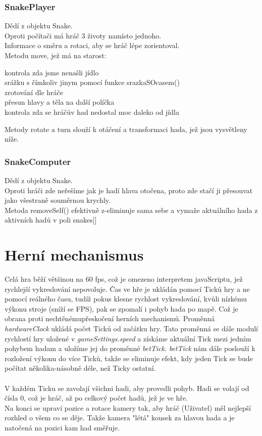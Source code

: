 \documentclass[a4paper,titlepage]{article}
\begin{document}
	\subsubsection{SnakePlayer}
		Dědí z objektu Snake.\\
		Oproti počítači má hráč 3 životy namísto jednoho.\\
		Informace o směru a rotaci, aby se hráč lépe zorientoval.\\
		Metodu move, jež má na starost:\\
		\begin{tabbing}
			kontrola zda jsme nenašli jídlo\\
			srážku s čímkoliv jinym pomocí funkce srazkaSOcasem()\\
			zrotování dle hráče\\
			přesun hlavy a těla na další políčka\\
			kontrola zda se hráčův had nedostal moc daleko od jídla 
		\end{tabbing}	
		Metody rotate a turn slouží k otáčení a transformaci hada, jež jsou vysvětleny níže.		
	\subsubsection{SnakeComputer}		
		Dědí z objektu Snake.\\
		Oproti hráči zde neřešíme jak je hadí hlava otočena, proto zde stačí ji přesouvat jako všestraně souměrnou krychly.\\
		Metoda removeSelf() efektivně z-eliminuje sama sebe a vymaže aktuálního hada z aktivních hadů v poli snakes[]
	\section{Herní mechanismus}
		Celá hra běží většinou na 60 fps, což je omezeno interpretem javaScriptu,
		jež rychlejší vykreslování nepovoluje.
		Čas ve hře je ukládán pomocí Ticků hry a ne pomocí reálného času,
		tudíž pokus klesne rychlost vykreslování,
		kvůli nízkému výkonu stroje (sníží se FPS), pak se zpomalí i pohyb hada po mapě.
		Což je obrana proti nechtěnémupřeskočení herních mechanismů.
		Proměnná \textit{hardwareClock} ukládá počet Ticků od začátku hry.
		Tato proměnná se dále modulí rychlostí hry uložené v \textit{gameSettings.speed}
		a získáme aktuální Tick mezi jedním pohybem hadam a uložíme jej do proměnné \textit{betTick}.
		\textit{betTick} nám dále poslouží k rozložení výkonu do více Ticků, takže se eliminuje efekt,
		kdy jeden Tick se bude počítat několika-násobně déle, než Ticky ostatní.\\
		\\
		V každém Ticku se zavolají všichni hadi, aby provedli pohyb. Hadi se volají od čísla 0, což je hráč, až
		po celkový počet hadů, jež je ve hře.\\
		Na konci se upraví pozice a rotace kamery tak, aby hráč (Uživatel) měl nejlepší rozhled o všem co se děje.
		Takže kamera "létá" kousek za hlavou hada a je natočená na pozici kam had směřuje. 
\end{document}
